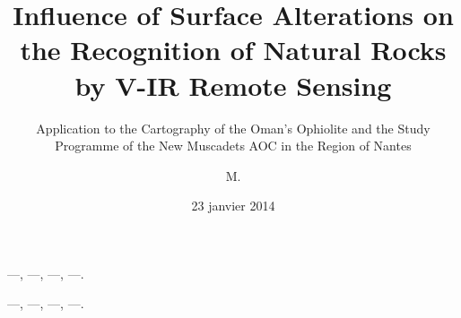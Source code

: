 \documentclass[12pt, english, fancyChapter, fancyPart, squeezeCommittee]{these-LUNAM-UBL}
\title{Influence of Surface Alterations on the Recognition of Natural Rocks by V-IR Remote Sensing}
\subtitle{Application to the Cartography of the Oman's Ophiolite and the Study Programme of the New Muscadets AOC in the Region of Nantes}
\author{M.}{Jean}{Duteil de la Jousselinière}
\date{23 janvier 2014}
\begin{document}
\begin{resume}
   \footnotesize
   \lipsum[1-2]
\end{resume}

\begin{motscles}
   ---, ---, ---, ---.
\end{motscles}

\begin{abstract}
   \footnotesize
   \lipsum[1-1]
\end{abstract}

\begin{keywords}
   ---, ---, ---, ---.
\end{keywords}

\maketitle

\end{document}
